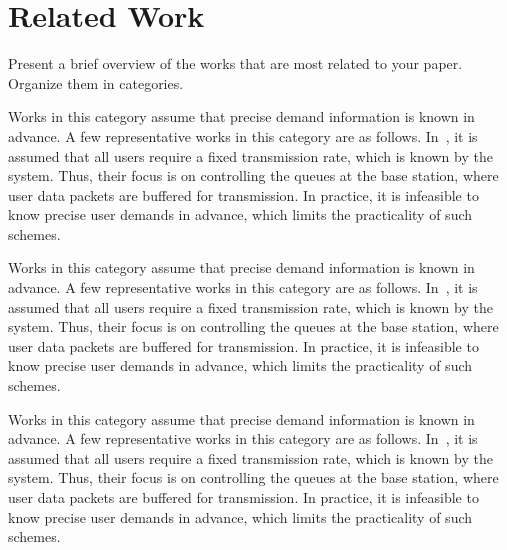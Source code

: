 \section{Related Work}
\label{s:related}

Present a brief overview of the works that are most related to your paper. Organize them in categories.

Works in this category assume that precise demand information is known in advance. A few representative works in this category are as follows. In~\cite{shi14}, it is assumed that all users require a fixed transmission rate, which is known by the system. Thus, their focus is on controlling the queues at the base station, where user data packets are buffered for transmission. In practice, it is infeasible to know precise user demands in advance, which limits the practicality of such schemes. 

Works in this category assume that precise demand information is known in advance. A few representative works in this category are as follows. In~\cite{shi14}, it is assumed that all users require a fixed transmission rate, which is known by the system. Thus, their focus is on controlling the queues at the base station, where user data packets are buffered for transmission. In practice, it is infeasible to know precise user demands in advance, which limits the practicality of such schemes. 

Works in this category assume that precise demand information is known in advance. A few representative works in this category are as follows. In~\cite{shi14}, it is assumed that all users require a fixed transmission rate, which is known by the system. Thus, their focus is on controlling the queues at the base station, where user data packets are buffered for transmission. In practice, it is infeasible to know precise user demands in advance, which limits the practicality of such schemes. 